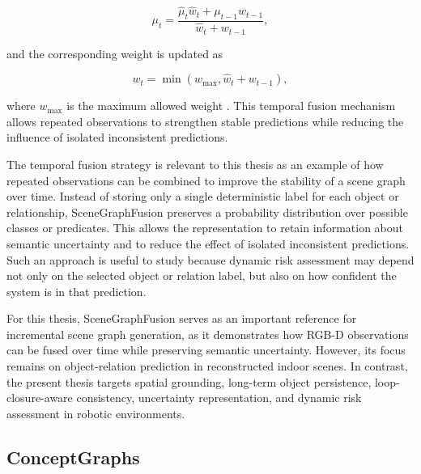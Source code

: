 {\[
\mu_t =
\frac{\hat{\mu}_t \hat{w}_t + \mu_{t-1} w_{t-1}}
{\hat{w}_t + w_{t-1}},
\]

and the corresponding weight is updated as

\[
w_t = \min(w_{\max}, \hat{w}_t + w_{t-1}),
\]

where $w_{\max}$ is the maximum allowed weight \cite{wu2021scenegraphfusion}. This temporal fusion mechanism allows repeated observations to strengthen stable predictions while reducing the influence of isolated inconsistent predictions.

The temporal fusion strategy is relevant to this thesis as an example of how repeated observations can be combined to improve the stability of a scene graph over time. Instead of storing only a single deterministic label for each object or relationship, SceneGraphFusion preserves a probability distribution over possible classes or predicates. This allows the representation to retain information about semantic uncertainty and to reduce the effect of isolated inconsistent predictions. Such an approach is useful to study because dynamic risk assessment may depend not only on the selected object or relation label, but also on how confident the system is in that prediction.

For this thesis, SceneGraphFusion serves as an important reference for incremental scene graph generation, as it demonstrates how RGB-D observations can be fused over time while preserving semantic uncertainty. However, its focus remains on object-relation prediction in reconstructed indoor scenes. In contrast, the present thesis targets spatial grounding, long-term object persistence, loop-closure-aware consistency, uncertainty representation, and dynamic risk assessment in robotic environments.

}


\subsection{ConceptGraphs}


